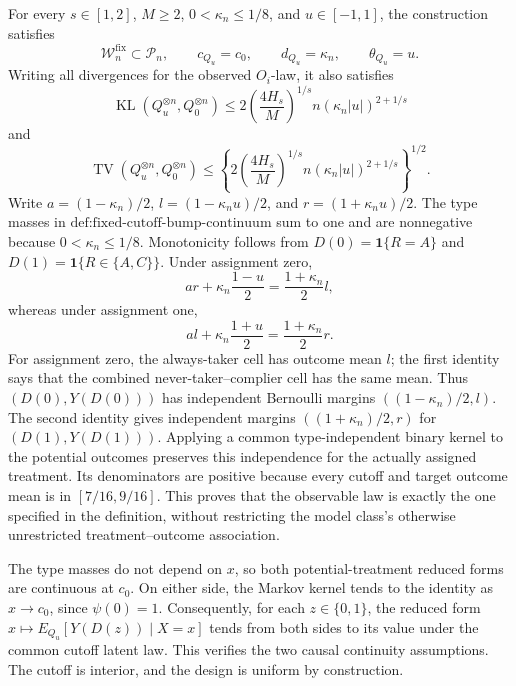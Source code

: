 For every \(s\in[1,2]\), \(M\ge2\), \(0<\kappa_n\le1/8\), and
\(u\in[-1,1]\), the construction satisfies
\[
 \mathcal W_n^{\mathrm{fix}}\subset\mathcal P_n,
 \qquad c_{Q_u}=c_0,
 \qquad d_{Q_u}=\kappa_n,
 \qquad \theta_{Q_u}=u.
\]
Writing all divergences for the observed \(O_i\)-law, it also satisfies
\[
 \operatorname{KL}(Q_u^{\otimes n},Q_0^{\otimes n})
 \le
 2\left(\frac{4H_s}{M}\right)^{1/s}
 n(\kappa_n|u|)^{2+1/s}
\]
and
\[
 \operatorname{TV}(Q_u^{\otimes n},Q_0^{\otimes n})
 \le
 \left\{2\left(\frac{4H_s}{M}\right)^{1/s}
 n(\kappa_n|u|)^{2+1/s}\right\}^{1/2}.
\]
Write \(a=(1-\kappa_n)/2\),
\(l=(1-\kappa_nu)/2\), and \(r=(1+\kappa_nu)/2\).
The type masses in \(\text{def:fixed-cutoff-bump-continuum}\) sum to one
and are nonnegative because \(0<\kappa_n\le1/8\).  Monotonicity follows
from \(D(0)=\mathbf 1\{R=A\}\) and
\(D(1)=\mathbf 1\{R\in\{A,C\}\}\).  Under assignment zero,
\[
 a r+\kappa_n\frac{1-u}{2}
 =\frac{1+\kappa_n}{2}l,
\]
whereas under assignment one,
\[
 a l+\kappa_n\frac{1+u}{2}
 =\frac{1+\kappa_n}{2}r.
\]
For assignment zero, the always-taker cell has outcome mean \(l\); the
first identity says that the combined never-taker--complier cell has the
same mean.  Thus \((D(0),Y(D(0)))\) has independent Bernoulli margins
\(((1-\kappa_n)/2,l)\).  The second identity gives independent margins
\(((1+\kappa_n)/2,r)\) for \((D(1),Y(D(1)))\).  Applying a common
type-independent binary kernel to the potential outcomes preserves this
independence for the actually assigned treatment.  Its denominators are
positive because every cutoff and target outcome mean is in
\([7/16,9/16]\).  This proves that the observable law is exactly the one
specified in the definition, without restricting the model class's
otherwise unrestricted treatment--outcome association.

The type masses do not depend on \(x\), so both potential-treatment
reduced forms are continuous at \(c_0\).  On either side, the Markov
kernel tends to the identity as \(x\to c_0\), since \(\psi(0)=1\).
Consequently, for each \(z\in\{0,1\}\), the reduced form
\(x\mapsto E_{Q_u}[Y(D(z))\mid X=x]\) tends from both sides to its value
under the common cutoff latent law.  This verifies the two causal
continuity assumptions.  The cutoff is interior, and the design is
uniform by construction.


